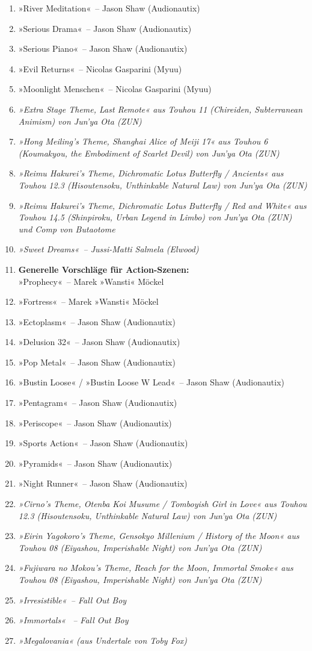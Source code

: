 \begin{enumerate}
    \item »River Meditation«~– Jason Shaw (Audionautix)
    \item »Serious Drama«~– Jason Shaw (Audionautix)
    \item »Serious Piano«~– Jason Shaw (Audionautix)
    \item »Evil Returns«~– Nicolas Gasparini (Myuu)
    \item »Moonlight Menschen«~– Nicolas Gasparini (Myuu)
    \item \textit{»Extra Stage Theme, Last Remote« aus Touhou 11 (Chireiden, Subterranean Animism) von Jun'ya Ota (ZUN)}
    \item \textit{»Hong Meiling's Theme, Shanghai Alice of Meiji 17« aus Touhou 6 (Koumakyou, the Embodiment of Scarlet Devil) von Jun'ya Ota (ZUN)}
    \item \textit{»Reimu Hakurei's Theme, Dichromatic Lotus Butterfly / Ancients« aus Touhou 12.3 (Hisoutensoku, Unthinkable Natural Law) von Jun'ya Ota (ZUN)}
    \item \textit{»Reimu Hakurei's Theme, Dichromatic Lotus Butterfly / Red and White« aus Touhou 14.5 (Shinpiroku, Urban Legend in Limbo) von Jun'ya Ota (ZUN) und Comp von Butaotome}
    \item \textit{»Sweet Dreams«~– Jussi-Matti Salmela (Elwood)}
    \item \textbf{Generelle Vorschläge für Action-Szenen:}\\ »Prophecy«~– Marek »Wansti« Möckel
    \item »Fortress«~– Marek »Wansti« Möckel
    \item »Ectoplasm«~– Jason Shaw (Audionautix)
    \item »Delusion 32«~– Jason Shaw (Audionautix)
    \item »Pop Metal«~– Jason Shaw (Audionautix)
    \item »Bustin Loose« / »Bustin Loose W Lead«~– Jason Shaw (Audionautix)
    \item »Pentagram«~– Jason Shaw (Audionautix)
    \item »Periscope«~– Jason Shaw (Audionautix)
    \item »Sports Action«~– Jason Shaw (Audionautix)
    \item »Pyramids«~– Jason Shaw (Audionautix)
    \item »Night Runner«~– Jason Shaw (Audionautix)
    \item \textit{»Cirno's Theme, Otenba Koi Musume / Tomboyish Girl in Love« aus Touhou 12.3 (Hisoutensoku, Unthinkable Natural Law) von Jun'ya Ota (ZUN)}
    \item \textit{»Eirin Yagokoro's Theme, Gensokyo Millenium / History of the Moon« aus Touhou 08 (Eiyashou, Imperishable Night) von Jun'ya Ota (ZUN)}
    \item \textit{»Fujiwara no Mokou's Theme, Reach for the Moon, Immortal Smoke« aus Touhou 08 (Eiyashou, Imperishable Night) von Jun'ya Ota (ZUN)}
    \item \textit{»Irresistible«~– Fall Out Boy}
    \item \textit{»Immortals« ~– Fall Out Boy}
    \item \textit{»Megalovania« (aus Undertale von Toby Fox)}


\end{enumerate}
